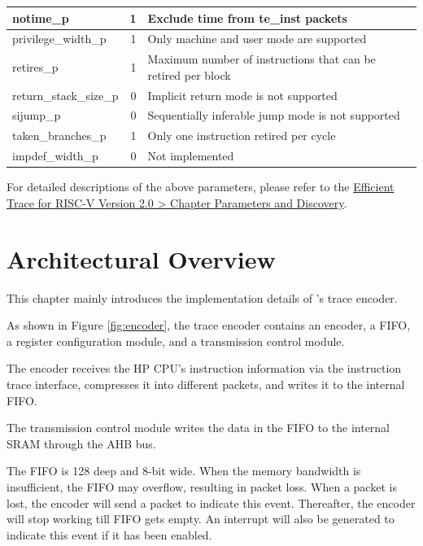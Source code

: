 \documentclass[main\_\_EN.tex]{subfiles}
\begin{document}
\begin{longtable}[c]{ |l|r|l| }
    notime\_p & 1 & Exclude time from te\_inst packets \\\hline
    privilege\_width\_p & 1 & Only machine and user mode are supported \\\hline
    retires\_p & 1 & Maximum number of instructions that can be retired per block \\\hline
    return\_stack\_size\_p & 0 & Implicit return mode is not supported \\\hline
    sijump\_p & 0 & Sequentially inferable jump mode is not supported \\\hline
    taken\_branches\_p & 1 & Only one instruction retired per cycle \\\hline
    impdef\_width\_p & 0 & Not implemented \\\hline

 \end{longtable}

For detailed descriptions of the above parameters, please refer to the \href{https://github.com/riscv-non-isa/riscv-trace-spec/releases}{Efficient Trace for RISC-V Version 2.0 > Chapter Parameters and Discovery}.



\section{Architectural Overview}
\label{sec:riscvtracenc-arch-overview}

This chapter mainly introduces the implementation details of \chipname{}'s trace encoder.

As shown in Figure \ref{fig:encoder}, the trace encoder contains an encoder, a FIFO, a register configuration module, and a transmission control module.

The encoder receives the HP CPU's instruction information via the instruction trace interface, compresses it into different packets, and writes it to the internal FIFO.

The transmission control module writes the data in the FIFO to the internal SRAM through the AHB bus.

The FIFO is 128 deep and 8-bit wide. When the memory bandwidth is insufficient, the FIFO may overflow, resulting in packet loss. When a packet is lost, the encoder will send a packet to indicate this event. Thereafter, the encoder will stop working till FIFO gets empty. An interrupt will also be generated to indicate this event if it has been enabled.
\end{document}
